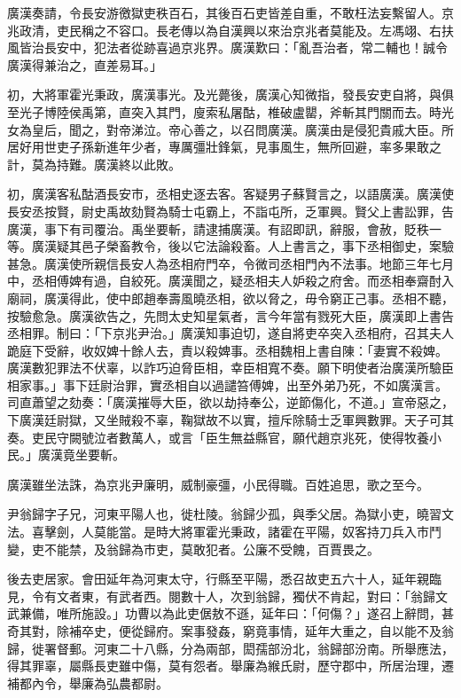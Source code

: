 \begin{pinyinscope}
廣漢奏請，令長安游徼獄吏秩百石，其後百石吏皆差自重，不敢枉法妄繫留人。京兆政清，吏民稱之不容口。長老傳以為自漢興以來治京兆者莫能及。左馮翊、右扶風皆治長安中，犯法者從跡喜過京兆界。廣漢歎曰：「亂吾治者，常二輔也！誠令廣漢得兼治之，直差易耳。」

初，大將軍霍光秉政，廣漢事光。及光薨後，廣漢心知微指，發長安吏自將，與俱至光子博陸侯禹第，直突入其門，廋索私屠酤，椎破盧罌，斧斬其門關而去。時光女為皇后，聞之，對帝涕泣。帝心善之，以召問廣漢。廣漢由是侵犯貴戚大臣。所居好用世吏子孫新進年少者，專厲彊壯鋒氣，見事風生，無所回避，率多果敢之計，莫為持難。廣漢終以此敗。

初，廣漢客私酤酒長安巿，丞相史逐去客。客疑男子蘇賢言之，以語廣漢。廣漢使長安丞按賢，尉史禹故劾賢為騎士屯霸上，不詣屯所，乏軍興。賢父上書訟罪，告廣漢，事下有司覆治。禹坐要斬，請逮捕廣漢。有詔即訊，辭服，會赦，貶秩一等。廣漢疑其邑子榮畜教令，後以它法論殺畜。人上書言之，事下丞相御史，案驗甚急。廣漢使所親信長安人為丞相府門卒，令微司丞相門內不法事。地節三年七月中，丞相傅婢有過，自絞死。廣漢聞之，疑丞相夫人妒殺之府舍。而丞相奉齋酎入廟祠，廣漢得此，使中郎趙奉壽風曉丞相，欲以脅之，毋令窮正己事。丞相不聽，按驗愈急。廣漢欲告之，先問太史知星氣者，言今年當有戮死大臣，廣漢即上書告丞相罪。制曰：「下京兆尹治。」廣漢知事迫切，遂自將吏卒突入丞相府，召其夫人跪庭下受辭，收奴婢十餘人去，責以殺婢事。丞相魏相上書自陳：「妻實不殺婢。廣漢數犯罪法不伏辜，以詐巧迫脅臣相，幸臣相寬不奏。願下明使者治廣漢所驗臣相家事。」事下廷尉治罪，實丞相自以過譴笞傅婢，出至外弟乃死，不如廣漢言。司直蕭望之劾奏：「廣漢摧辱大臣，欲以劫持奉公，逆節傷化，不道。」宣帝惡之，下廣漢廷尉獄，又坐賊殺不辜，鞠獄故不以實，擅斥除騎士乏軍興數罪。天子可其奏。吏民守闕號泣者數萬人，或言「臣生無益縣官，願代趙京兆死，使得牧養小民。」廣漢竟坐要斬。

廣漢雖坐法誅，為京兆尹廉明，威制豪彊，小民得職。百姓追思，歌之至今。

尹翁歸字子兄，河東平陽人也，徙杜陵。翁歸少孤，與季父居。為獄小吏，曉習文法。喜擊劍，人莫能當。是時大將軍霍光秉政，諸霍在平陽，奴客持刀兵入巿鬥變，吏不能禁，及翁歸為巿吏，莫敢犯者。公廉不受餽，百賈畏之。

後去吏居家。會田延年為河東太守，行縣至平陽，悉召故吏五六十人，延年親臨見，令有文者東，有武者西。閱數十人，次到翁歸，獨伏不肯起，對曰：「翁歸文武兼備，唯所施設。」功曹以為此吏倨敖不遜，延年曰：「何傷？」遂召上辭問，甚奇其對，除補卒史，便從歸府。案事發姦，窮竟事情，延年大重之，自以能不及翁歸，徙署督郵。河東二十八縣，分為兩部，閎孺部汾北，翁歸部汾南。所舉應法，得其罪辜，屬縣長吏雖中傷，莫有怨者。舉廉為緱氏尉，歷守郡中，所居治理，遷補都內令，舉廉為弘農都尉。


\end{pinyinscope}
